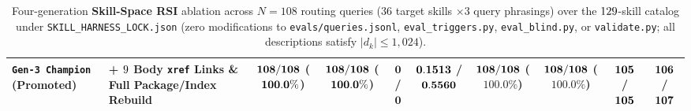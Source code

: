 \begin{table}[t]
{\begin{tabular}{llcccccccc}
\textbf{\texttt{Gen-3 Champion} (Promoted)} & \textbf{+ $9{}$ Body \texttt{xref} Links \& Full Package/Index Rebuild} & $\mathbf{108{}/108}$ ($\mathbf{100.0{}\%}$) & $\mathbf{108{}/108}$ ($\mathbf{100.0{}\%}$) & $\mathbf{0}$ / $\mathbf{0}$ & $\mathbf{0.1513{}}$ / $\mathbf{0.5560{}}$ & $\mathbf{108{}/108}$ ($\mathbf{100.0\%}$) & $\mathbf{108{}/108}$ ($\mathbf{100.0\%}$) & $\mathbf{105{}}$ / $\mathbf{105{}}$ & $\mathbf{106{}}$ / $\mathbf{107{}}$ \\
\bottomrule
\end{tabular}%
}
\caption{Four-generation \textbf{Skill-Space RSI} ablation across $N=108$ routing queries ($36$ target skills $\times 3$ query phrasings) over the $129{}$-skill catalog under \texttt{SKILL\_HARNESS\_LOCK.json} (zero modifications to \texttt{evals/queries.jsonl}, \texttt{eval\_triggers.py}, \texttt{eval\_blind.py}, or \texttt{validate.py}; all descriptions satisfy $|d_k| \le 1{,}024$).}
\label{tab:skill_rsi_ablation}
\end{table}

